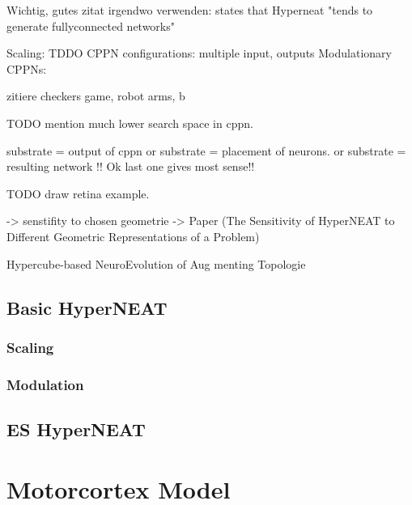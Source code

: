   
 
 

 Wichtig, gutes zitat irgendwo verwenden:
 \cite{HyperNEATLeo} states that Hyperneat "tends to generate fullyconnected networks"

 Scaling: TDDO 
 CPPN configurations: multiple input, outputs
 Modulationary CPPNs:
 
 
 zitiere checkers game, robot arms, b

TODO mention much lower search space in cppn.


substrate = output of cppn
or substrate = placement of neurons.
or substrate = resulting network !!
Ok last one gives most sense!!

TODO draw retina example.

-> senstifity to chosen geometrie -> Paper (The Sensitivity of HyperNEAT to Different Geometric Representations of a Problem)

Hypercube-based NeuroEvolution of Aug
menting Topologie
\subsection{Basic HyperNEAT}
\subsubsection{Scaling}
\subsubsection{Modulation}
\subsection{ES HyperNEAT}\label{ES_HYPERNEAT}

\section{Motorcortex Model}\label{MotorCortex_Model}